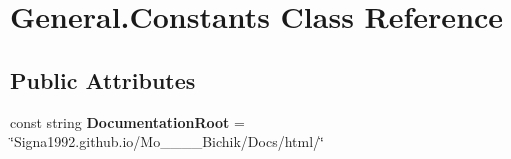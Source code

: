 \hypertarget{class_general_1_1_constants}{}\section{General.\+Constants Class Reference}
\label{class_general_1_1_constants}
\subsection*{Public Attributes}
\begin{DoxyCompactItemize}
\item 
\hypertarget{class_general_1_1_constants_afe575eae96a11ac5a1db6caf00c6b209}{}const string {\bfseries Documentation\+Root} = \char`\"{}Signa1992.\+github.\+io/Mo\+\_\+\_\+\_\+\_\+\+Bichik/Docs/html/\char`\"{}\label{class_general_1_1_constants_afe575eae96a11ac5a1db6caf00c6b209}

\end{DoxyCompactItemize}
